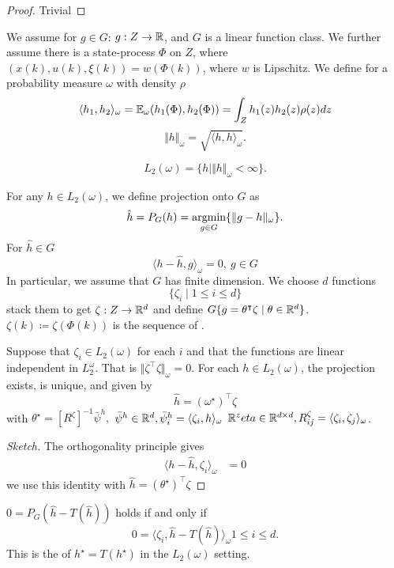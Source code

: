 \begin{proof}
    Trivial
\end{proof}

We assume for \(g\in G\): \(g:Z\to\mathbb{R}\), and \(G\) is a linear function class. We further assume 
there is a state-process \(\Phi\) on \(Z\), where \((x(k),u(k),\xi(k))=w(\Phi(k))\), where \(w\)
is Lipschitz. We define for a probability measure \(\omega\) with density \(\rho\)
\[\langle h_1,h_2\rangle_\omega=\mathbb{E}_\omega(h_1(\Phi),h_2(\Phi))=\int_Z h_1(z)h_2(z)\rho(z)dz\] 
\[\Vert h\Vert_\omega=\sqrt{\langle h,h\rangle_\omega}.\]

\[L_2(\omega)=\{h\mid \Vert h\Vert_\omega<\infty\}.\] %

For any \(h\in L_2(\omega)\), we define projection onto \(G\) as
\[\hat{h}=P_G(h)=\operatorname*{\text{argmin}}_{g\in G}\{\Vert g-h\Vert_\omega\}.\]
For \(\hat{h}\in G\)
\[\langle h-\hat{h},g\rangle_\omega=0,\ g\in G\]
In particular, we assume that \(G\) has finite dimension. We choose \(d\) functions 
\[\{\zeta_i\mid 1\leq i\leq d\}\] 
stack them to get \(\zeta:Z\to\mathbb{R}^d\) and define \(G\{g=\theta^\intercal\zeta\mid \theta\in\mathbb{R}^d\}\).
\(\zeta(k)\coloneqq \zeta(\Phi(k))\) is the sequence of .

\begin{proposition}\label{prop:49}
    Suppose that \(\zeta_i\in L_2(\omega)\) for each \(i\) and that the functions are linear independent in \(L_2^\omega\).
    That is \(\Vert \zeta^\intercal\zeta\Vert_\omega=0\). For each \(h\in L_2(\omega)\), the projection exists, is unique,
    and given by \[\hat{h}=(\omega^\star)^\intercal\zeta\]
    with  \(\theta^\star=[R^\zeta]^{-1}\bar{\psi}^h,\) \(\bar{\psi}^h\in \mathbb{R}^d,\bar{\psi}_i^h=\langle\zeta_i,h\rangle_\omega\)
    \(\mathbb{R}^zeta\in\mathbb{R}^{d\times d},R_{ij}^\zeta=\langle \zeta_i,\zeta_j\rangle_\omega\).
\end{proposition}

\begin{proof}[Sketch]
    The orthogonality principle gives 
    \begin{align*}
        \langle h-\hat{h},\zeta_i\rangle_\omega&=0
    \end{align*}
    we use this identity with \(\hat{h}=(\theta^\star)^\intercal \zeta\)
\end{proof}

\begin{proposition}\label{prop:50}
    \(0=P_G(\hat{h}-T(\hat{h}))\) holds if and only if 
    \[0=\langle \zeta_i,\hat{h}-T(\hat{h})\rangle_\omega 1\leq i\leq d.\]
    This is the  of \(h^\star=T(h^\star)\) in the \(L_2(\omega)\) setting.
\end{proposition}

